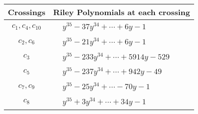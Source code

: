 \documentclass[1p]{elsarticle_modified}
\theoremstyle{definition}
\begin{document}
\begin{tabular}{m{50pt}|m{274pt}}
Crossings & \hspace{64pt}Riley Polynomials at each crossing \\
\hline $$\begin{aligned}c_{1},c_{4},c_{10}\end{aligned}$$&$\begin{aligned}
&y^{35}-37 y^{34}+\cdots+6 y-1
\end{aligned}$\\
\hline $$\begin{aligned}c_{2},c_{6}\end{aligned}$$&$\begin{aligned}
&y^{35}-21 y^{34}+\cdots+6 y-1
\end{aligned}$\\
\hline $$\begin{aligned}c_{3}\end{aligned}$$&$\begin{aligned}
&y^{35}-233 y^{34}+\cdots+5914 y-529
\end{aligned}$\\
\hline $$\begin{aligned}c_{5}\end{aligned}$$&$\begin{aligned}
&y^{35}-237 y^{34}+\cdots+942 y-49
\end{aligned}$\\
\hline $$\begin{aligned}c_{7},c_{9}\end{aligned}$$&$\begin{aligned}
&y^{35}-25 y^{34}+\cdots-70 y-1
\end{aligned}$\\
\hline $$\begin{aligned}c_{8}\end{aligned}$$&$\begin{aligned}
&y^{35}+3 y^{34}+\cdots+34 y-1
\end{aligned}$\\
\hline
\end{tabular}
\vskip 2pc
\end{document}
